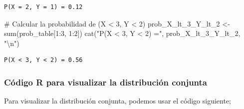 \documentclass[
  a4paper,
  DIV=11,
  numbers=noendperiod]{scrreprt}
\newenvironment{Shaded}{\begin{snugshade}}{\end{snugshade}}
\newcommand{\CommentTok}[1]{\textcolor[rgb]{0.37,0.37,0.37}{#1}}
\newcommand{\DecValTok}[1]{\textcolor[rgb]{0.68,0.00,0.00}{#1}}
\newcommand{\FunctionTok}[1]{\textcolor[rgb]{0.28,0.35,0.67}{#1}}
\newcommand{\NormalTok}[1]{\textcolor[rgb]{0.00,0.23,0.31}{#1}}
\newcommand{\OtherTok}[1]{\textcolor[rgb]{0.00,0.23,0.31}{#1}}
\newcommand{\SpecialCharTok}[1]{\textcolor[rgb]{0.37,0.37,0.37}{#1}}
\newcommand{\StringTok}[1]{\textcolor[rgb]{0.13,0.47,0.30}{#1}}
\begin{document}
\begin{verbatim}
P(X = 2, Y = 1) = 0.12 
\end{verbatim}

\begin{Shaded}
\begin{Highlighting}[]
\CommentTok{\# Calcular la probabilidad de (X \textless{} 3, Y \textless{} 2)}
\NormalTok{prob\_X\_lt\_3\_Y\_lt\_2 }\OtherTok{\textless{}{-}} \FunctionTok{sum}\NormalTok{(prob\_table[}\DecValTok{1}\SpecialCharTok{:}\DecValTok{3}\NormalTok{, }\DecValTok{1}\SpecialCharTok{:}\DecValTok{2}\NormalTok{])}
\FunctionTok{cat}\NormalTok{(}\StringTok{"P(X \textless{} 3, Y \textless{} 2) ="}\NormalTok{, prob\_X\_lt\_3\_Y\_lt\_2, }\StringTok{"}\SpecialCharTok{\textbackslash{}n}\StringTok{"}\NormalTok{)}
\end{Highlighting}
\end{Shaded}

\begin{verbatim}
P(X < 3, Y < 2) = 0.56 
\end{verbatim}

\subsubsection{Código R para visualizar la distribución
conjunta}\label{cuxf3digo-r-para-visualizar-la-distribuciuxf3n-conjunta}

Para visualizar la distribución conjunta, podemos usar el código
siguiente;
\end{document}
